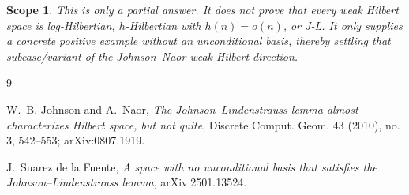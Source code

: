 \documentclass[11pt]{amsart}
\newtheorem*{scope}{Scope}
\begin{document}
\begin{scope}
This is only a partial answer.  It does not prove that every weak Hilbert
space is log-Hilbertian, \(h\)-Hilbertian with \(h(n)=o(n)\), or J-L.  It only
supplies a concrete positive example without an unconditional basis, thereby
settling that subcase/variant of the Johnson--Naor weak-Hilbert direction.
\end{scope}

\begin{thebibliography}{9}

W.~B. Johnson and A.~Naor,
\emph{The Johnson--Lindenstrauss lemma almost characterizes Hilbert space, but
not quite},
Discrete Comput. Geom. 43 (2010), no. 3, 542--553; arXiv:0807.1919.

J.~Suarez de la Fuente,
\emph{A space with no unconditional basis that satisfies the
Johnson--Lindenstrauss lemma},
arXiv:2501.13524.

\end{thebibliography}
\end{document}
